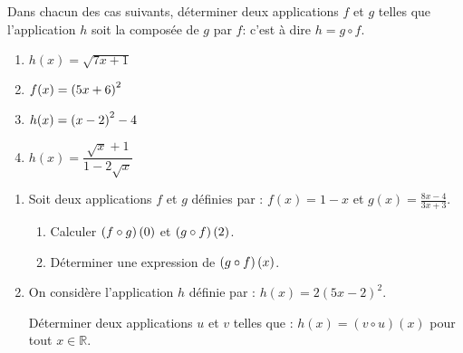 \begin{exercice}[Décomposition]
 Dans chacun des cas suivants, déterminer deux applications   $  f $  et $ g $  telles que  l'application $ h $  soit la composée de   $  g $  par  $ f $:\; c'est à dire $ h=g\circ f $.

\begin{enumerate}
\item  $ h(x)= \sqrt{7x+1} $ 


\item  $ f(x)= \left(5x+6\right)^{2} $  


\item  $ h(x)= \left(x-2\right)^{2} -4 $ 



\item $ h(x)= \dfrac{\sqrt{x}+1}{1-2\sqrt{x}} $ 
\end{enumerate}

\end{exercice}
\begin{exercice}
\begin{enumerate}
\item Soit deux applications  $ f $ et $ g $ définies par :\;  $f(x)=1-x $ et $ g(x)=\frac{8x-4}{3x+3}$.
\begin{enumerate}
\item Calculer  $ \left(f\circ g\right)(0) $\;  et \; $ \left(g\circ f\right)(2) $.
\item Déterminer une expression de $ \left(g\circ f\right)(x) $. 
\end{enumerate}
\item On considère l'application $ h $ définie par :\; $ h(x)=2(5x-2)^2$.

 Déterminer deux applications  $ u $ et $ v $ telles que :\; $ h(x)=(v\circ u)(x)$\;\; pour tout \; $ x\in\mathbb{R} $.

\end{enumerate}
\end{exercice}
